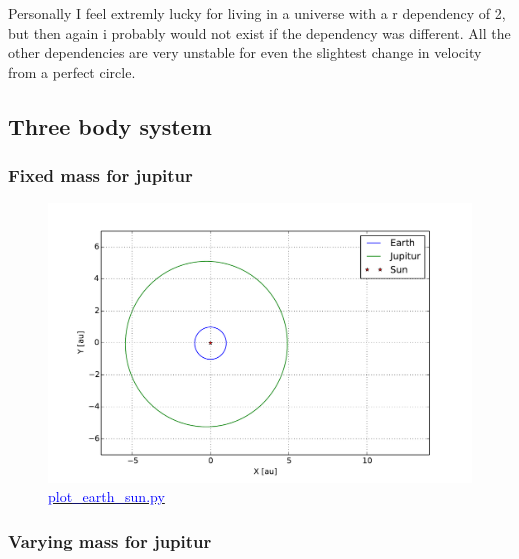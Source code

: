 Personally I feel extremly lucky for living in a universe with a r dependency of 2, but then again i probably would not exist if the dependency was different. All the other dependencies are very unstable for even the slightest change in velocity from a perfect circle.


















\subsection{Three body system}

\subsubsection{Fixed mass for jupitur}

\begin{figure}[H]
    \centering
    \includegraphics[width=\linewidth]{result/bilder/jupitur-mass.pdf}
    \caption{\href{https://github.com/erikfsk/Project-3/blob/master/Project3/3a/plot_earth_sun.py}{\textcolor{blue}{plot\_earth\_sun.py}}}
    \label{fig:three-body}
\end{figure}


\subsubsection{Varying mass for jupitur}

